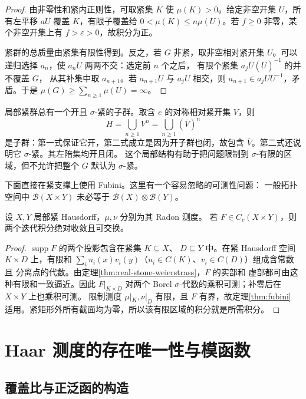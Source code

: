 \begin{proof}
由非零性和紧内正则性，可取紧集 $K$ 使 $\mu(K)>0$。给定非空开集
$U$，所有左平移 $aU$ 覆盖 $K$，有限子覆盖给
$0<\mu(K)\le n\mu(U)$。若 $f\ge0$ 非零，某个非空开集上有
$f>\varepsilon>0$，故积分为正。

紧群的总质量由紧集有限性得到。反之，若 $G$ 非紧，取非空相对紧开集
$U$。可以递归选择 $a_n$，使 $a_nU$ 两两不交：选定前 $n$ 个之后，
有限个紧集 $a_j\overline U(\overline U)^{-1}$ 的并不覆盖 $G$，
从其补集中取 $a_{n+1}$。若 $a_{n+1}U$ 与 $a_jU$ 相交，则
$a_{n+1}\in a_jUU^{-1}$，矛盾。于是
$\mu(G)\ge\sum_{n\ge1}\mu(U)=\infty$。
\end{proof}

局部紧群总有一个开且 $\sigma$-紧的子群。取含 $e$ 的对称相对紧开集
$V$，则
\[
 H=\bigcup_{n\ge1}V^n=\bigcup_{n\ge1}(\overline V)^n
\]
是子群：第一式保证它开，第二式成立是因为开子群也闭，故包含
$\overline V$。第二式还说明它 $\sigma$-紧。其左陪集均开且闭。
这个局部结构有助于把问题限制到 $\sigma$-有限的区域，但不允许把整个
$G$ 默认为 $\sigma$-紧。

下面直接在紧支撑上使用 Fubini。这里有一个容易忽略的可测性问题：
一般拓扑空间中 $\mathcal B(X\times Y)$ 未必等于
$\mathcal B(X)\otimes\mathcal B(Y)$。

\begin{lemma}[紧支撑双重积分]
\label{lem:haar-compact-fubini}
设 $X,Y$ 局部紧 Hausdorff，$\mu,\nu$ 分别为其 Radon 测度。
若 $F\in C_c(X\times Y)$，则两个迭代积分绝对收敛且可交换。
\end{lemma}

\begin{proof}
$\operatorname{supp}F$ 的两个投影包含在紧集 $K\subseteq X$、
$D\subseteq Y$ 中。在紧 Hausdorff 空间 $K\times D$ 上，有限和
$\sum_i u_i(x)v_i(y)$（$u_i\in C(K)$、$v_i\in C(D)$）组成含常数且
分离点的代数。由定理\ref{thm:real-stone-weierstrass}，$F$ 的实部和
虚部都可由这种有限和一致逼近。因此 $F|_{K\times D}$ 对两个 Borel
$\sigma$-代数的乘积可测；补零后在 $X\times Y$ 上也乘积可测。
限制测度 $\mu|_K,\nu|_D$ 有限，且 $F$ 有界，故定理\ref{thm:fubini}
适用。紧矩形外所有截面均为零，所以该有限区域的积分就是所需积分。
\end{proof}

\section{Haar 测度的存在唯一性与模函数}
\label{sec:haar-existence-uniqueness-modular}

\subsection{覆盖比与正泛函的构造}

